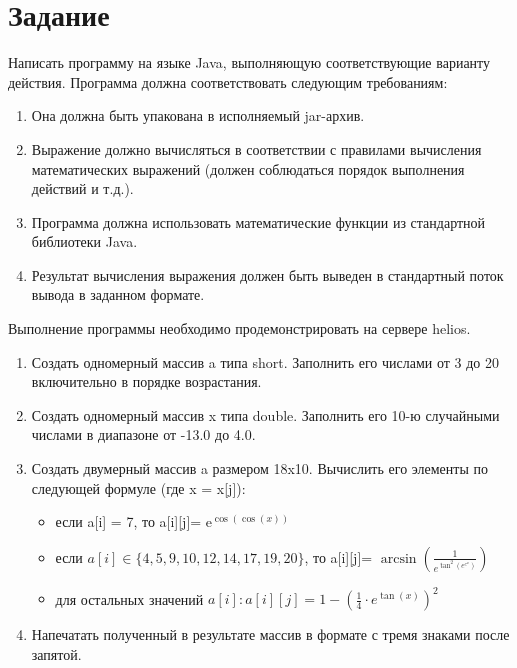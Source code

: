 \section{Задание}

Написать программу на языке Java, выполняющую соответствующие варианту действия. Программа должна соответствовать следующим требованиям:
\begin{enumerate} 
    \item Она должна быть упакована в исполняемый jar-архив.
    \item Выражение должно вычисляться в соответствии с правилами вычисления математических выражений (должен соблюдаться порядок выполнения действий и т.д.).
    \item Программа должна использовать математические функции из стандартной библиотеки Java.
    \item Результат вычисления выражения должен быть выведен в стандартный поток вывода в заданном формате.
\end{enumerate}
Выполнение программы необходимо продемонстрировать на сервере helios.\newline \newline

\begin{enumerate} 
    \item Создать одномерный массив a типа short. Заполнить его числами от 3 до 20 включительно в порядке возрастания.
    \item Создать одномерный массив x типа double. Заполнить его 10-ю случайными числами в диапазоне от -13.0 до 4.0.
    \item Создать двумерный массив a размером 18x10. Вычислить его элементы по следующей формуле (где x = x[j]): 
        \begin{itemize}
            \item если a[i] = 7, то a[i][j]= e$^{\cos (\cos (x))}$ 
            \item если $a[i] \in \{4, 5, 9, 10, 12, 14, 17, 19, 20\}$, то a[i][j]= $\arcsin (\frac{1}{e^{\tan^2 (e^{e^x}) } })$ 
            \item для остальных значений $a[i]: a[i][j]=1 - (\frac{1}{4} \cdot e^{\tan(x)})^{2}$
        \end{itemize}
    \item Напечатать полученный в результате массив в формате с тремя знаками после запятой.        
\end{enumerate}

